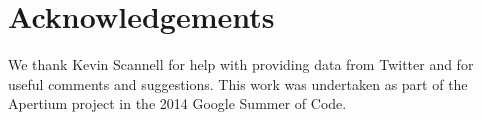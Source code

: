\documentclass[11pt]{article}
\begin{document}


\section*{Acknowledgements}
\vspace{-0.132cm}

We thank Kevin Scannell for help with providing data from Twitter and for useful comments and suggestions. This work
was undertaken as part of the Apertium project in the 2014 Google Summer of Code.



\end{document}
